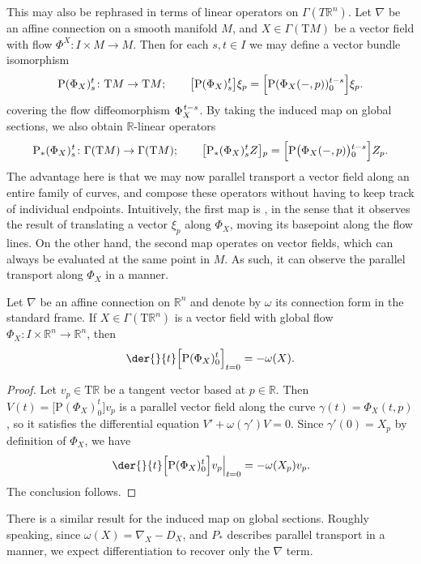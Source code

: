 This may also be rephrased in terms of linear operators on $\Gamma(T\mathbb{R}^n)$. Let $\nabla$ be an affine connection on a smooth manifold $M$, and $X \in \Gamma(\mathrm{T}M)$ be a vector field with flow $\Phi^X \colon I \times M \to M$. Then for each $s, t \in I$ we may define a vector bundle isomorphism
\begin{equation}
  \mathrm{P}(\Phi_X)_s^t \colon \mathrm{T}M \to \mathrm{T}M; \quad \quad \big[\mathrm{P}(\Phi_X)^{\mskip 0.5mu t}_{s}\big] \xi_{p} = \Big[\mathrm{P}(\Phi_X(-, p))_{0}^{t-s}\Big] \xi_{p}. 
\end{equation}
covering the flow diffeomorphism $\Phi_{X}^{\mskip 2mu t-s}$.
By taking the induced map on global sections, we also obtain  $\mathbb{R}$-linear operators
\begin{equation}
\mathrm{P}_\ast(\Phi_X)_{s}^{\mskip 1mu t} \colon \Gamma(\mathrm{T}M) \to \Gamma(\mathrm{T}M); \quad \quad \big[\mathrm{P}_\ast(\Phi_X)_{s}^{\mskip 0.5mu t} Z\big]{}_{p} = \Big[ \mathrm{P}\big(\Phi_X (-, p)\big){}_{0}^{t - s} \Big] Z_{p}.
\end{equation}
The advantage here is that we may now parallel transport a vector field along an entire family of curves, and compose these operators without having to keep track of individual endpoints. Intuitively, the first map is , in the sense that it observes the result of translating a vector $\xi_p$ along $\Phi_X$, moving its basepoint along the flow lines. On the other hand, the second map operates on vector fields, which can always be evaluated at the same point in $M$. As such, it can observe the parallel transport along $\Phi_X$ in a  manner.


\begin{theorem}
  Let $\nabla$ be an affine connection on $\mathbb{R}^n$ and denote  by $\omega$ its connection form in the standard frame. If $X \in \Gamma(\mathrm{T}\mathbb{R}^n)$ is a vector field with global flow $\Phi_X \colon I \times \mathbb{R}^n \to \mathbb{R}^n$, then
  \begin{equation}
    \der{}{t} \Big[ \mathrm{P}(\Phi_X)_{0}^{t}
    \Big]_{t=0} = -\omega(X). 
  \end{equation}
\end{theorem}
\begin{proof}
  Let $v_p \in \mathrm{T}\mathbb{R}$ be a tangent vector based at $p \in \mathbb{R}$. Then $V(t) = \big[\mathrm{P}(\Phi_X)^t_0\big] v_p$ is a parallel vector field along the curve $\gamma(t) = \Phi_X(t, p)$, so it satisfies the differential equation $V' + \omega(\gamma')V = 0$. Since $\gamma'(0) = X_p$ by definition of $\Phi_X$, we have 
  \begin{equation}
    \left.\der{}{t} \Big[\mathrm{P}(\Phi_X)_{0}^{t}\Big]v_p\right|_{t=0} = -\omega(X_p)v_p.
  \end{equation}
  The conclusion follows.
\end{proof}
There is a similar result for the induced map on global sections. Roughly speaking, since $\omega(X) = \nabla_X - D_X$, and $P_\ast$ describes parallel transport in a  manner,  we expect differentiation to recover only the $\nabla$ term.

